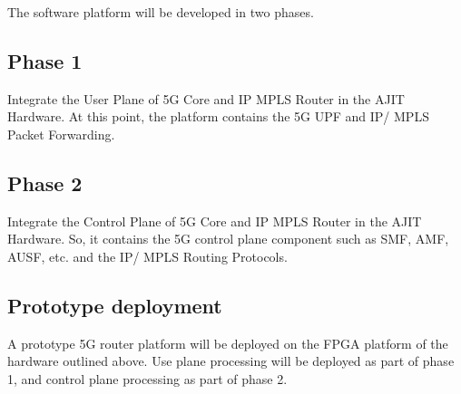 \documentclass{article}
\begin{document}
The software platform will be developed in two phases.

\subsection{Phase 1}

Integrate the User Plane of 5G Core and IP MPLS Router in the AJIT Hardware. 
At this point, the platform contains the 5G UPF and IP/ MPLS Packet Forwarding.

\subsection{Phase 2}

Integrate the Control Plane of 5G Core and IP MPLS Router in the AJIT Hardware. 
So, it contains the 5G control plane component such as SMF, AMF, AUSF, etc. and 
the IP/ MPLS Routing Protocols.

\subsection{Prototype deployment}

A prototype 5G router platform will be deployed on the FPGA platform of 
the hardware outlined above.  Use plane processing will be deployed as
part of phase 1, and control plane processing as part of phase 2.
\end{document}
